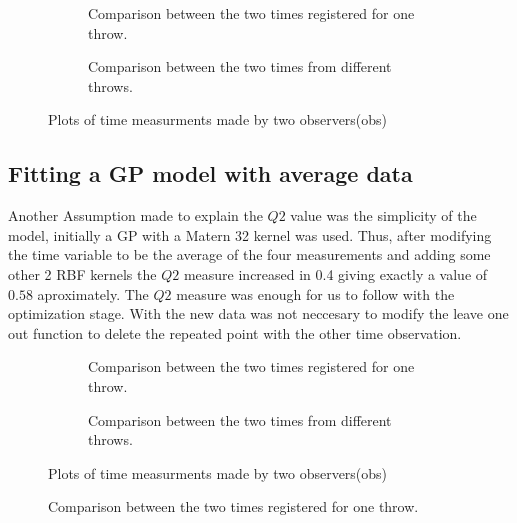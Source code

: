 \begin{figure}
	\begin{subfigure}[h]{.5\linewidth}
		
		\caption{Comparison between the two times registered for one throw.}
		\label{fig_EX1_EX1}
	\end{subfigure}
	\begin{subfigure}[h]{.5\linewidth}
		
		\caption{Comparison between the two times from different throws.}
		\label{fig_EX1_EX2}
	\end{subfigure}
	\caption{Plots of time measurments made by two observers(obs)}
\end{figure}

\subsection{Fitting a GP model with average data}

Another Assumption made to explain the $Q2$ value was the simplicity of the model, initially a GP with a Matern 32 kernel was used. Thus, after modifying the time variable to be the average of the four measurements and adding some other 2 RBF kernels the $Q2$ measure increased in 0.4 giving exactly a value of $0.58$ aproximately. The $Q2$ measure was enough for us to follow with the optimization stage. With the new data was not neccesary to modify the leave one out function to delete the repeated point with the other time observation.

\begin{figure}
	\begin{subfigure}[h]{.5\linewidth}
		
		\caption{Comparison between the two times registered for one throw.}
		\label{fig_wtr_vs_obs2}
	\end{subfigure}
	\begin{subfigure}[h]{.5\linewidth}
		
		\caption{Comparison between the two times from different throws.}
		\label{fig_wtr_vs_avg4}
	\end{subfigure}
	\caption{Plots of time measurments made by two observers(obs)}
\end{figure}

\begin{figure}[h]
	
	\caption{Comparison between the two times registered for one throw.}
	\label{mloo_vs_real}
\end{figure}
